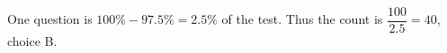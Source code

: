 One question is $100\%-97.5\%=2.5\%$ of the test. Thus the count is $\dfrac{100}{2.5}=\boxed{40}$, choice B.
